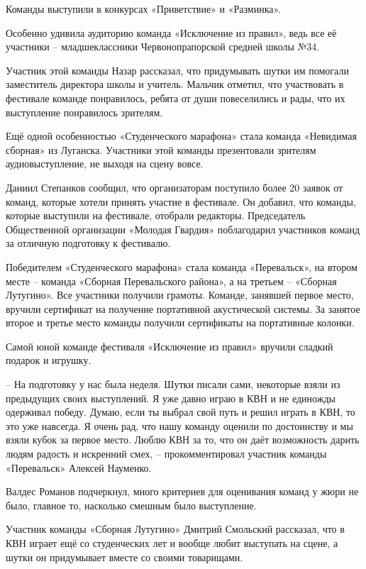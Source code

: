 
Команды выступили в конкурсах «Приветствие» и «Разминка».

Особенно удивила аудиторию команда «Исключение из правил», ведь все её
участники – младшеклассники Червонопрапорской средней школы №34.

Участник этой команды Назар рассказал, что придумывать шутки им помогали
заместитель директора школы и учитель. Мальчик отметил, что участвовать в
фестивале команде понравилось, ребята от души повеселились и рады, что их
выступление понравилось зрителям.


Ещё одной особенностью «Студенческого марафона» стала команда «Невидимая
сборная» из Луганска. Участники этой команды презентовали зрителям
аудиовыступление, не выходя на сцену вовсе.

Даниил Степанков сообщил, что организаторам поступило более 20 заявок от
команд, которые хотели принять участие в фестивале. Он добавил, что команды,
которые выступили на фестивале, отобрали редакторы. Председатель Общественной
организации «Молодая Гвардия» поблагодарил участников команд за отличную
подготовку к фестивалю.

Победителем «Студенческого марафона» стала команда «Перевальск», на втором
месте – команда «Сборная Перевальского района», а на третьем – «Сборная
Лутугино». Все участники получили грамоты. Команде, занявшей первое место,
вручили сертификат на получение портативной акустической системы. За занятое
второе и третье место команды получили сертификаты на портативные колонки.

Самой юной команде фестиваля «Исключение из правил» вручили сладкий подарок и
игрушку.

– На подготовку у нас была неделя. Шутки писали сами, некоторые взяли из
предыдущих своих выступлений. Я уже давно играю в КВН и не единожды одерживал
победу. Думаю, если ты выбрал свой путь и решил играть в КВН, то это уже
навсегда. Я очень рад, что нашу команду оценили по достоинству и мы взяли кубок
за первое место. Люблю КВН за то, что он даёт возможность дарить людям радость
и искренний смех, – прокомментировал участник команды «Перевальск» Алексей
Науменко.

Валдес Романов подчеркнул, много критериев для оценивания команд у жюри не
было, главное то, насколько смешным было выступление.

Участник команды «Сборная Лутугино» Дмитрий Смольский рассказал, что в КВН
играет ещё со студенческих лет и вообще любит выступать на сцене, а шутки он
придумывает вместе со своими товарищами.

